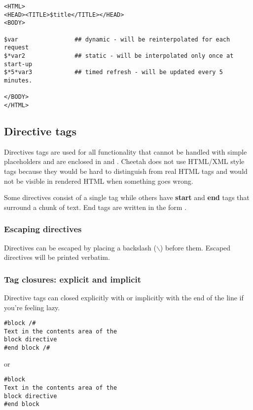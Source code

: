 \begin{enumerate}
\begin{verbatim}
<HTML>
<HEAD><TITLE>$title</TITLE></HEAD>
<BODY>

$var                ## dynamic - will be reinterpolated for each request
$*var2              ## static - will be interpolated only once at start-up
$*5*var3            ## timed refresh - will be updated every 5 minutes.

</BODY>
</HTML>
\end{verbatim}


\subsection{Directive tags}
Directives tags are used for all functionality that cannot be handled with
simple placeholders and are enclosed in \code{\#} and \code{/\#}.
Cheetah does not use HTML/XML style tags because they would be hard to
distinguish from real HTML tags and would not be visible in rendered HTML when
something goes wrong.

Some directives consist of a single tag while others have {\bf start} and
{\bf end} tags that surround a chunk of text.  End tags are written in the form
.

\subsubsection{Escaping directives}
Directives can be escaped by placing a backslash ($\backslash$) before them.
Escaped directives will be printed verbatim.

\subsubsection{Tag closures: explicit and implicit}
Directive tags can closed explicitly with \code{/\#} or implicitly with the end
of the line if you're feeling lazy.
\begin{verbatim}
#block /#
Text in the contents area of the
block directive
#end block /#
\end{verbatim}
or
\begin{verbatim}
#block
Text in the contents area of the
block directive
#end block
\end{verbatim}


\end{enumerate}
